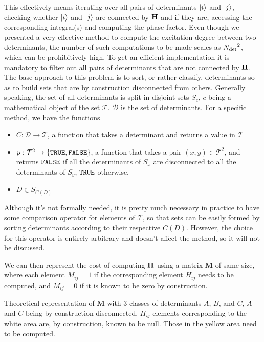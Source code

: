 \documentclass[./thesis.tex]{subfiles}
\begin{document}
This effectively means iterating over all pairs of determinants ${\ket{i}}$ and ${\ket{j}}$, checking whether ${\ket{i}}$ and ${\ket{j}}$ are connected by $\mathbf{H}$ and if they are, accessing the corresponding integral(s) and computing the phase factor.
Even though we presented a very effective method to compute the excitation degree between two determinants, the number of such computations to be made scales as ${N_\text{det}}^2$, which can be prohibitively high. To get an efficient implementation it is mandatory to filter out all pairs of determinants that are not connected by $\mathbf{H}$.
The base approach to this problem is to sort, or rather classify, determinants so as to build sets that are by construction disconnected from others. Generally speaking, the set of all determinants is split in disjoint sets $S_c$, $c$ being a mathematical object of the set $\mathcal{T}$. $\mathcal{D}$ is the set of determinants. For a specific method, we have the functions
\begin{itemize}
	\item
	$C : \mathcal{D} \rightarrow \mathcal{T}$, a function that takes a determinant and returns a value in $\mathcal{T}$
	\item
	$p : \mathcal{T}^2 \rightarrow \{ {\text{\texttt{TRUE}}}, {\text{\texttt{FALSE}}} \}$, a function that takes a pair $(x,y) \in \mathcal{T}^2$, and returns ${\text{\texttt{FALSE}}}$ if all the determinants of $S_x$ are disconnected to all the determinants of $S_y$, ${\text{\texttt{TRUE}}}$ otherwise.
	\item
	$D \in S_{C(D)}$
\end{itemize}  


Although it's not formally needed, it is pretty much necessary in practice to have some comparison operator for elements of $\mathcal{T}$, so that sets can be easily formed by sorting determinants according to their respective $C(D)$. However, the choice for this operator is entirely arbitrary and doesn't affect the method, so it will not be discussed.
    
    
We can then represent the cost of computing $\mathbf{H}$ using a matrix $\mathbf{M}$ of same size, where each element $M_{ij}=1$ if the corresponding element $H_{ij}$ needs to be computed, and $M_{ij}=0$ if it is known to be zero by construction.

\alert{
Theoretical representation of $\mathbf{M}$ with 3 classes of determinants $A$, $B$, and $C$, $A$ and $C$ being by construction disconnected. $H_{ij}$ elements corresponding to the white area are, by construction, known to be null. Those in the yellow area need to be computed.
}
    
\end{document}
